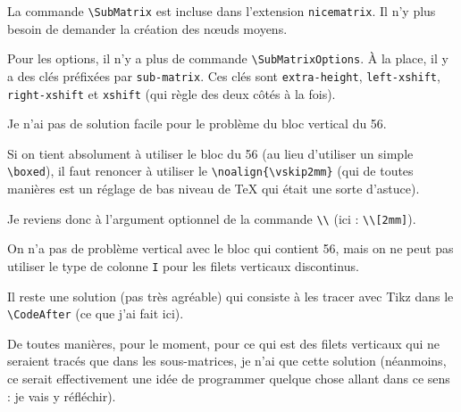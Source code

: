 \documentclass[notitlepage]{article}
\begin{document}
La commande \verb|\SubMatrix| est incluse dans l'extension \verb|nicematrix|. Il n'y plus besoin de demander la
création des nœuds moyens.

Pour les options, il n'y a plus de commande \verb|\SubMatrixOptions|. À la place, il y a des clés préfixées par \verb|sub-matrix|.
Ces clés sont \verb|extra-height|, \verb|left-xshift|, \verb|right-xshift| et \verb|xshift| (qui règle des deux
côtés à la fois).



\vspace{2mm}
Je n'ai pas de solution facile pour le problème du bloc vertical du 56.

Si on tient absolument à utiliser le bloc du 56 (au lieu d'utiliser un simple \verb|\boxed|), il faut renoncer à
utiliser le \verb|\noalign{\vskip2mm}| (qui de toutes manières est un réglage de bas niveau de TeX qui était une sorte d'astuce).

Je reviens donc à l'argument optionnel de la commande \verb|\\| (ici : \verb|\\[2mm]|).

On n'a pas de problème vertical avec le bloc qui contient 56, mais on ne peut pas utiliser le type de colonne
\verb|I| pour les filets verticaux discontinus.

Il reste une solution (pas très agréable) qui consiste à les tracer avec Tikz dans le \verb|\CodeAfter| (ce que j'ai fait ici).

De toutes manières, pour le moment, pour ce qui est des filets verticaux qui ne seraient tracés que dans les
sous-matrices, je n'ai que cette solution (néanmoins, ce serait effectivement une idée de programmer quelque chose
allant dans ce sens : je vais y réfléchir).
\end{document}
